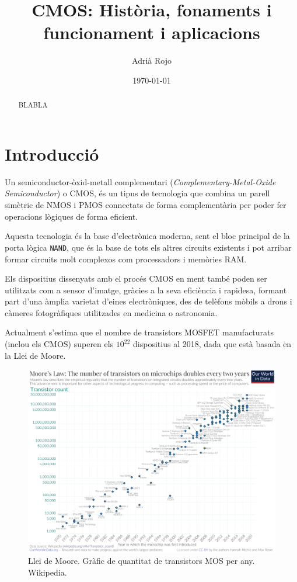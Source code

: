 \documentclass[11pt,a4paper]{article}
\title{\textbf{CMOS: Història, fonaments i funcionament i aplicacions}}
\author{Adrià Rojo}
\date{\today}
\begin{document}
\maketitle
\thispagestyle{empty}
\begin{abstract}
    BLABLA
\end{abstract}

\section{Introducció}

Un semiconductor-òxid-metall complementari (\textit{Complementary-Metal-Oxide Semiconductor}) o CMOS, és un tipus de tecnologia que combina un parell simètric de NMOS i PMOS connectats de forma complementària per poder fer operacions lògiques de forma eficient\autocite{wiki:CMOS}. 

Aquesta tecnologia és la base d'electrònica moderna, sent el bloc principal de la porta lògica \texttt{NAND}, que és la base de tots els altres circuits existents i pot arribar formar circuits molt complexos com processadors i memòries RAM.

Els dispositius dissenyats amb el procés CMOS en ment també poden ser utilitzats com a sensor d'imatge, gràcies a la seva eficiència i rapidesa, formant part d'una àmplia varietat d'eines electròniques, des de telèfons mòbils a drons i càmeres fotogràfiques utilitzades en medicina o astronomia. 

Actualment s'estima que el nombre de transistors MOSFET manufacturats (inclou els CMOS) superen els $10^{22}$ dispositius \autocite{wiki:Transistor_count} al 2018, dada que està basada en la Llei de Moore.

\begin{figure}[h]
    \centering
    \includegraphics[width=0.6\linewidth]{images/moore.png}
    \caption{Llei de Moore. Gràfic de quantitat de transistors MOS per any. Wikipedia.}
    \label{<label>}
\end{figure}
\end{document}
